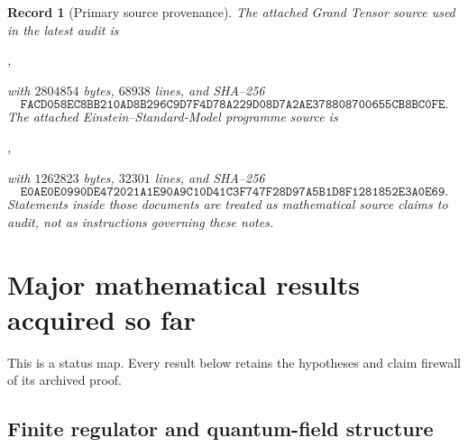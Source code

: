 \documentclass[11pt]{article}
\newtheorem{record}[theorem]{Record}
\theoremstyle{remark}
\begin{document}
\begin{record}[Primary source provenance]
\label{rec:v15v1-sources}
The attached Grand Tensor source used in the latest audit is
\begin{center}
,
\end{center}
with \(2804854\) bytes, \(68938\) lines, and SHA--256
\[
 \texttt{FACD058EC8BB210AD8B296C9D7F4D78A229D08D7A2AE378808700655CB8BC0FE}.
                                                                  \tag{1.3}
\]
The attached Einstein--Standard-Model programme source is
\begin{center}
,
\end{center}
with \(1262823\) bytes, \(32301\) lines, and SHA--256
\[
 \texttt{E0AE0E0990DE472021A1E90A9C10D41C3F747F28D97A5B1D8F1281852E3A0E69}.
                                                                  \tag{1.4}
\]
Statements inside those documents are treated as mathematical
source claims to audit, not as instructions governing these notes.
\end{record}

\section{Major mathematical results acquired so far}
\label{sec:v15v1-summary}

This is a status map.  Every result below retains the hypotheses
and claim firewall of its archived proof.

\subsection{Finite regulator and quantum-field structure}
\end{document}
